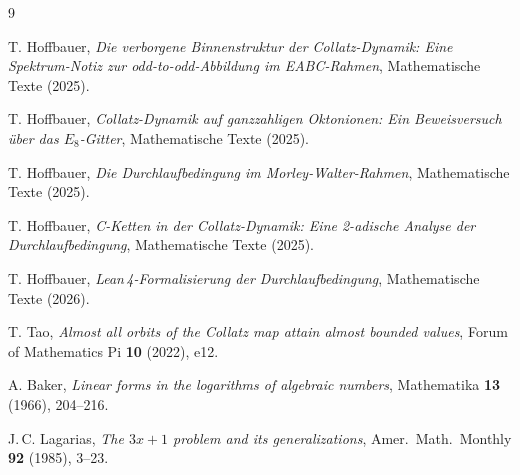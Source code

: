 \documentclass[12pt,a4paper]{article}
\begin{document}
\begin{thebibliography}{9}

T. Hoffbauer,
\textit{Die verborgene Binnenstruktur der Collatz-Dynamik:
Eine Spektrum-Notiz zur odd-to-odd-Abbildung im EABC-Rahmen},
Mathematische Texte (2025).

T. Hoffbauer,
\textit{Collatz-Dynamik auf ganzzahligen Oktonionen:
Ein Beweisversuch über das $E_8$-Gitter},
Mathematische Texte (2025).

T. Hoffbauer,
\textit{Die Durchlaufbedingung im Morley-Walter-Rahmen},
Mathematische Texte (2025).

T. Hoffbauer,
\textit{C-Ketten in der Collatz-Dynamik:
Eine 2-adische Analyse der Durchlaufbedingung},
Mathematische Texte (2025).

T. Hoffbauer,
\textit{Lean\,4-Formalisierung der Durchlaufbedingung},
Mathematische Texte (2026).

T. Tao,
\textit{Almost all orbits of the Collatz map attain almost bounded values},
Forum of Mathematics Pi \textbf{10} (2022), e12.

A. Baker,
\textit{Linear forms in the logarithms of algebraic numbers},
Mathematika \textbf{13} (1966), 204--216.

J.\,C. Lagarias,
\textit{The $3x+1$ problem and its generalizations},
Amer.\ Math.\ Monthly \textbf{92} (1985), 3--23.

\end{thebibliography}
\end{document}
